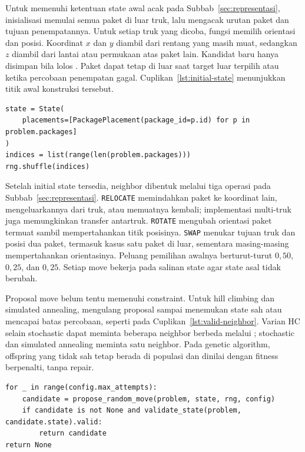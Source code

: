 \documentclass[12pt,a4paper]{article}
\begin{document}
Untuk memenuhi ketentuan state awal acak pada Subbab~\ref{sec:representasi}, inisialisasi memulai semua paket di luar truk, lalu mengacak urutan paket dan tujuan penempatannya. Untuk setiap truk yang dicoba, fungsi memilih orientasi dan posisi. Koordinat $x$ dan $y$ diambil dari rentang yang masih muat, sedangkan $z$ diambil dari lantai atau permukaan atas paket lain. Kandidat baru hanya disimpan bila lolos . Paket dapat tetap di luar saat target luar terpilih atau ketika percobaan penempatan gagal. Cuplikan~\ref{lst:initial-state} menunjukkan titik awal konstruksi tersebut.

\begin{lstlisting}[emph={State,PackagePlacement,shuffle},caption={Pembentukan initial state dalam \texttt{initializer.py}},label={lst:initial-state}]
state = State(
    placements=[PackagePlacement(package_id=p.id) for p in problem.packages]
)
indices = list(range(len(problem.packages)))
rng.shuffle(indices)
\end{lstlisting}

Setelah initial state tersedia, neighbor dibentuk melalui tiga operasi pada Subbab~\ref{sec:representasi}. \texttt{RELOCATE} memindahkan paket ke koordinat lain, mengeluarkannya dari truk, atau memuatnya kembali; implementasi multi-truk juga memungkinkan transfer antartruk. \texttt{ROTATE} mengubah orientasi paket termuat sambil mempertahankan titik posisinya. \texttt{SWAP} menukar tujuan truk dan posisi dua paket, termasuk kasus satu paket di luar, sementara masing-masing mempertahankan orientasinya. Peluang pemilihan awalnya berturut-turut $0{,}50$, $0{,}25$, dan $0{,}25$. Setiap move bekerja pada salinan state agar state asal tidak berubah.

Proposal move belum tentu memenuhi constraint. Untuk hill climbing dan simulated annealing,  mengulang proposal sampai menemukan state sah atau mencapai batas percobaan, seperti pada Cuplikan~\ref{lst:valid-neighbor}. Varian HC selain stochastic dapat meminta beberapa neighbor berbeda melalui ; stochastic dan simulated annealing meminta satu neighbor. Pada genetic algorithm, offspring yang tidak sah tetap berada di populasi dan dinilai dengan fitness berpenalti, tanpa repair.

\begin{lstlisting}[emph={propose_random_move,validate_state,valid},caption={Penerimaan neighbor yang sah dalam \texttt{neighbors.py}},label={lst:valid-neighbor}]
for _ in range(config.max_attempts):
    candidate = propose_random_move(problem, state, rng, config)
    if candidate is not None and validate_state(problem, candidate.state).valid:
        return candidate
return None
\end{lstlisting}
\end{document}
